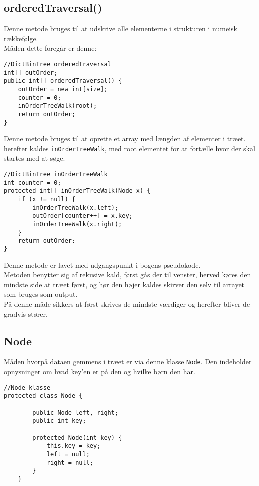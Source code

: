 \documentclass{article}
\begin{document}
\subsection*{orderedTraversal()}
Denne metode bruges til at udskrive alle elementerne i strukturen i numeisk rækkefølge.\\
Måden dette foregår er denne:
\begin{lstlisting}
//DictBinTree orderedTraversal
int[] outOrder;
public int[] orderedTraversal() {
    outOrder = new int[size];
    counter = 0;
    inOrderTreeWalk(root);
    return outOrder;
}
\end{lstlisting}
\bigskip
Denne metode bruges til at oprette et array med længden af elementer i træet. herefter kaldes \texttt{inOrderTreeWalk}, med root elementet for at fortælle hvor der skal startes med at søge.
\begin{lstlisting}
//DictBinTree inOrderTreeWalk
int counter = 0;
protected int[] inOrderTreeWalk(Node x) {
	if (x != null) {
		inOrderTreeWalk(x.left);
		outOrder[counter++] = x.key;
		inOrderTreeWalk(x.right);
	}
	return outOrder;
}
\end{lstlisting}
\bigskip
Denne metode er lavet med udgangspunkt i bogens pseudokode.\\
Metoden benytter sig af rekusive kald, først gås der til venster, herved køres den mindste side at træet først, og hør den højer kaldes skirver den selv til arrayet som bruges som output.\\
På denne måde sikkers at først skrives de mindste værdiger og herefter bliver de gradvis stører.
\subsection*{Node}
Måden hvorpå dataen gemmens i træet er via denne klasse \texttt{Node}. Den indeholder opnysninger om hvad key'en er på den og hvilke børn den har.
\begin{lstlisting}
//Node klasse
protected class Node {

        public Node left, right;
        public int key;
        
        protected Node(int key) {
            this.key = key;
            left = null;
            right = null;
        }
    }
\end{lstlisting}
\bigskip
\newpage
\end{document}
